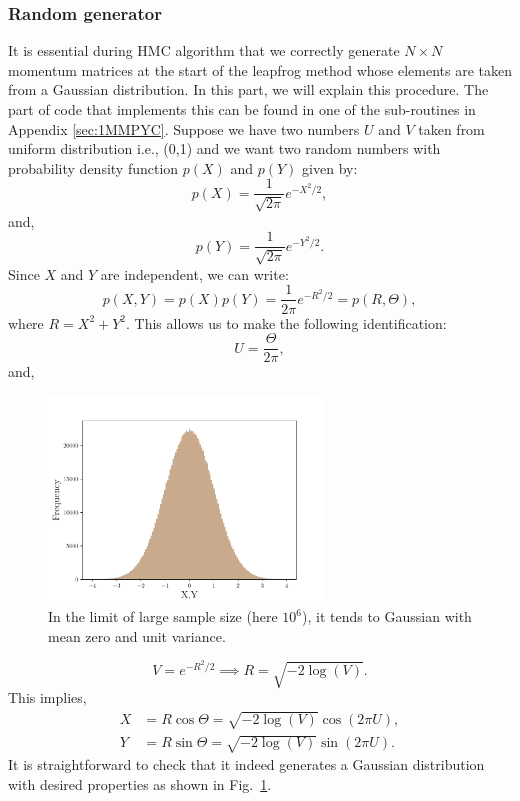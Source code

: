 \documentclass[letter,11pt]{article}
\begin{document}
\subsubsection{Random generator}  
It is essential during HMC algorithm that we correctly generate $ N \times N$ momentum matrices at the start of the leapfrog method whose elements are taken from a Gaussian distribution. In this part, we will explain this procedure. The part of code that implements this can be found in one of the sub-routines in Appendix \ref{sec:1MMPYC}.  Suppose we have two numbers $U$ and $V$ taken from uniform distribution i.e., (0,1) and we want two random numbers with probability density function $p(X)$ and $p(Y)$ given by:
\begin{equation}
	p(X) = \frac{1}{\sqrt{2\pi}} e^{-X^2/2}, 
\end{equation}
and, 
\begin{equation}
	p(Y) = \frac{1}{\sqrt{2\pi}} e^{-Y^2/2} .
\end{equation}
Since $X$ and $Y$ are independent, we can write:
\begin{equation}
	p(X,Y) = p(X) p(Y) = \frac{1}{2\pi} e^{-R^2/2} = p(R, \Theta),  
\end{equation}
where $R = X^2 + Y^2$. This allows us to make the following identification:
\begin{equation}
	U = \frac{\Theta}{2\pi}, 
\end{equation}
and, 
\begin{figure}[htbp] 
	\centering 
	\includegraphics[width=0.65\textwidth]{figs/testRN.pdf}
	\caption{\label{fig:RN}In the limit of large sample size (here $10^6$), 
	it tends to Gaussian with mean zero and unit variance.}
\end{figure}
\begin{equation}
	V = e^{-R^2/2} \implies R = \sqrt{-2 \log(V)}. 
\end{equation}
This implies, 
\begin{align}
	X &= R \cos \Theta = \sqrt{-2 \log(V)} \cos(2 \pi U), \\
	Y &= R \sin \Theta = \sqrt{-2 \log(V)} \sin(2 \pi U).
\end{align}
It is straightforward to check that it indeed generates a Gaussian distribution with desired properties as shown in Fig.~\ref{fig:RN}.
\end{document}
